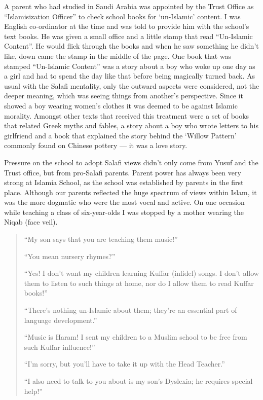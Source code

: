 \documentclass[12pt]{memoir}
\newcommand{\cor}[2]{#2} %
\begin{document}
A parent who had studied in Saudi Arabia was appointed
by the Trust Office as “Islamisization Officer”
to check school books for ‘un-Islamic’ content.
I was English co-ordinator at the time
and was told to provide him with the school’s text books.
He was given a small office and a little stamp
that \cor{that}{} read “Un-Islamic Content”.
He would flick \cor{though}{through} the books
and when he saw something he didn’t like,
down came the stamp in the middle of the page.
One book that was stamped “Un-Islamic Content” was a story about a boy
who woke up one day as a girl and had to spend the day like that
before being magically turned back.
As usual with the Salafi mentality,
only the outward aspects were considered, not the deeper meaning,
which was seeing things from another’s perspective.
Since it showed a boy wearing women’s clothes
it was deemed to be against Islamic morality.
Amongst other texts that received this treatment were a set of books
that related Greek myths and fables,
a story about a boy who wrote letters to his girlfriend
and a book that explained the story behind the ‘Willow Pattern’
commonly found on Chinese pottery — it was a love story.

Pressure on the school to adopt Salafi views didn’t only come from Yusuf
and the Trust office, but from pro-Salafi parents.
Parent power has always been very strong at Islamia School,
as the school was established by parents in the first place.
Although our parents reflected the huge spectrum of views within Islam,
it was the more dogmatic who were the most vocal and active.
On one occasion while teaching a class of six-year-olds
I was stopped by a mother wearing the Niqab (face veil).

\begin{quote}
“My son says that you are teaching them music!”

“You mean nursery rhymes?”

“Yes! I don’t want my children learning Kuffar (infidel) songs.
I don’t allow them to listen to such things at home,
nor do I allow them to read Kuffar books!”

“There’s nothing un-Islamic about them;
they’re an essential part of language development.”

“Music is Haram! I sent my children to a Muslim school
to be free from such Kuffar influence!”

“I’m sorry, but you’ll have to take it up with the Head Teacher.”

“I also need to talk to you about is my son’s Dyslexia;
he requires special help!”
\end{quote}
\end{document}
